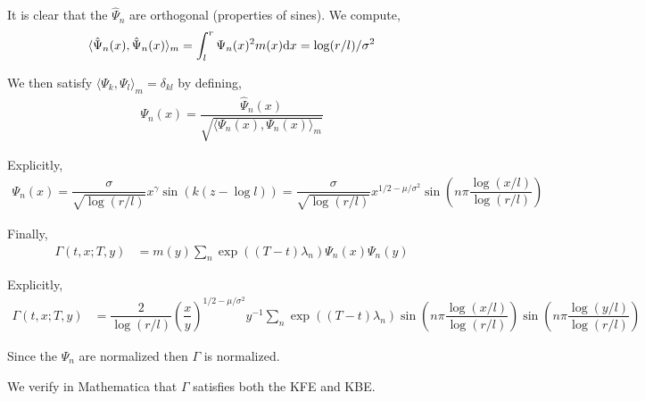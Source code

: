 \begin{solution}[Solution]
It is clear that the \( \hat{\Psi}_n \) are orthogonal (properties of sines). We compute,
\begin{align*}
    \langle \hat{\Psi}_n(x), \hat{\Psi}_n(x) \rangle_m 
    = \int_{l}^{r}\Psi_n(x)^2 m(x) \mathrm{d} x 
    = \log(r/l) / \sigma^2
\end{align*}

We then satisfy \( \langle \Psi_k ,\Psi_l \rangle_m = \delta_{kl} \) by defining,
\begin{align*}
    \Psi_n(x) = \dfrac{ \hat{\Psi}_n(x) }{\sqrt{\langle \Psi_n(x), \Psi_n(x) \rangle_m}}
\end{align*}

Explicitly,
\begin{align*}
    \Psi_n(x) = \dfrac{\sigma}{\sqrt{\log(r/l)}}x^{\gamma}\sin(k(z-\log l)) 
    = \dfrac{\sigma}{\sqrt{\log(r/l)}}x^{1/2 - \mu/\sigma^2} \sin \left( n\pi \dfrac{\log(x/l)}{\log(r/l)} \right)
\end{align*}


Finally,
\begin{align*}
    \Gamma(t,x;T,y) &= m(y) \sum_{n} \exp((T-t) \lambda_n) \Psi_n(x)\Psi_n(y) 
\end{align*}

Explicitly,
\begin{align*}
    \Gamma(t,x;T,y) &= \dfrac{2}{\log(r/l)} \left( \dfrac{x}{y} \right)^{1/2-\mu/\sigma^2}y^{-1} \sum_{n} \exp((T-t) \lambda_n) \sin \left( n\pi \dfrac{\log(x/l)}{\log(r/l)} \right) \sin \left( n\pi \dfrac{\log(y/l)}{\log(r/l)} \right)
\end{align*}

Since the \( \Psi_n \) are normalized then \( \Gamma \) is normalized.

We verify in Mathematica that \( \Gamma \) satisfies both the KFE and KBE.
\end{solution}

